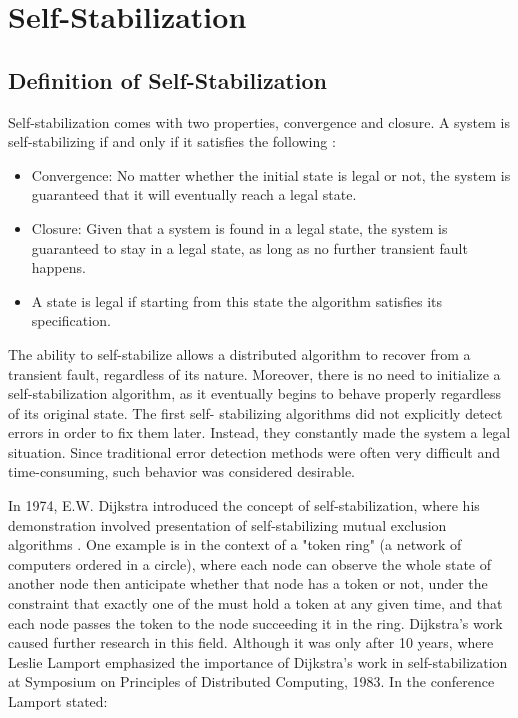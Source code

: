 \documentclass[12pt,a4paper]{report}
\begin{document}
		\section{Self-Stabilization}
			\subsection{Definition of Self-Stabilization}
			Self-stabilization comes with two properties, convergence and closure. A system is self-stabilizing if and only if it satisfies the following \cite{dolev}:
			\begin{itemize}
					\item Convergence: No matter whether the initial state is legal or not, the system is guaranteed that it will eventually reach a legal state.
					\item Closure: Given that a system is found in a legal state, the system is guaranteed to stay in a legal state, as long as no further transient fault 
					happens.
					\item A state is legal if starting from this state the algorithm satisfies its         specification.
			\end{itemize}
			

			The ability to self-stabilize allows a distributed algorithm to recover from a transient fault, regardless of its nature. Moreover, there is no 
			need to initialize a self-stabilization algorithm, as it eventually begins to behave properly regardless of its original state. The first self-
			stabilizing algorithms did not explicitly detect errors in order to fix them later. Instead, they constantly made the system a legal situation. 
			Since traditional error detection methods were often very difficult and time-consuming, such behavior was considered desirable.

			In 1974, E.W. Dijkstra introduced the concept of self-stabilization, where his demonstration involved presentation of self-stabilizing mutual exclusion algorithms \cite{dijkstrass}. One example is in the context of a "token ring" (a network of computers ordered in a circle), where each node can observe the whole state of another node then anticipate whether that node has a token or not, under the constraint that exactly one of the must hold a token at any given time, and that each node passes the token to the node succeeding it in the ring. Dijkstra's work caused further research in this field. Although it was only after 10 years, where Leslie Lamport emphasized the importance of Dijkstra's work in self-stabilization at Symposium on Principles of Distributed Computing, 1983. In the conference Lamport stated:
\end{document}
